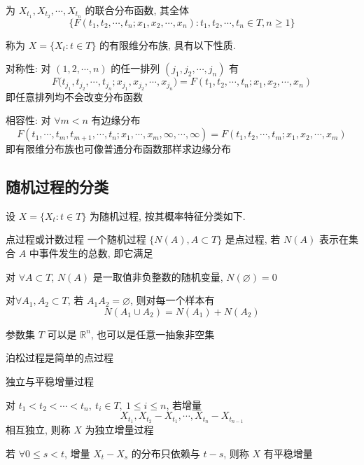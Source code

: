 \documentclass[openany]{ctexbook}
\theoremstyle{kaiti}
\theoremstyle{normal}
\begin{document}
为 $X_{t_1},X_{t_2},\cdots,X_{t_n}$ 的联合分布函数, 其全体
\begin{equation}
  \{F(t_1,t_2,\cdots,t_n;x_1,x_2,\cdots,x_n):t_1,t_2,\cdots,t_n\in T,n\geqslant1\}
\end{equation}

称为 $X=\{X_t:t\in T\}$ 的有限维分布族, 具有以下性质.

对称性: 对 $(1,2,\cdots,n)$ 的任一排列 $(j_1,j_2,\cdots,j_n)$ 有
\begin{equation}
  F\Big(t_{j_1},t_{j_2},\cdots,t_{j_n};x_{j_1},x_{j_2},\cdots,x_{j_n}\Big)=F(t_1,t_2,\cdots,t_n;x_1,x_2,\cdots,x_n)
\end{equation} 即任意排列均不会改变分布函数

相容性: 对 $\forall m<n$ 有边缘分布
\begin{equation}
  F(t_1,\cdots,t_m,t_{m+1},\cdots,t_n;x_1,\cdots,x_m,\infty,\cdots,\infty)=F(t_1,t_2,\cdots,t_m;x_1,x_2,\cdots,x_m)
\end{equation} 即有限维分布族也可像普通分布函数那样求边缘分布

\subsection{随机过程的分类}

设 $X=\{X_t:t\in T\}$ 为随机过程, 按其概率特征分类如下.

点过程或计数过程
一个随机过程 $\{N(A),A\subset T\}$ 是点过程, 若 $N(A)$ 表示在集合 $A$ 中事件发生的总数, 即它满足

对 $\forall A\subset T$, $N(A)$ 是一取值非负整数的随机变量, $N(\varnothing)=0$

对$\forall A_1,A_2\subset T$, 若 $A_1A_2=\varnothing$, 则对每一个样本有
\begin{equation}
  N(A_1\cup A_2)=N(A_1)+N(A_2)
\end{equation}

参数集 $T$ 可以是 $\mathbb{R}^n$, 也可以是任意一抽象非空集

泊松过程是简单的点过程

独立与平稳增量过程

对 $t_1<t_2<\cdots<t_n,~t_i\in T,~1\leqslant i\leqslant n$, 若增量
\begin{equation}
  X_{t_1},X_{t_2}-X_{t_1},\cdots,X_{t_n}-X_{t_{n-1}}
\end{equation}
相互独立, 则称 $X$ 为独立增量过程

若 $\forall0\leqslant s<t$, 增量 $X_t-X_s$ 的分布只依赖与 $t-s$, 则称 $X$ 有平稳增量
\end{document}
